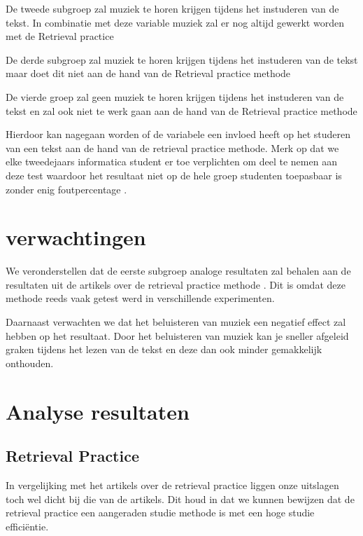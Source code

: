\documentclass{hogent-article}
\begin{document}
	De tweede subgroep zal muziek te horen krijgen tijdens het instuderen van de tekst. In combinatie met deze variable muziek zal er nog altijd gewerkt worden met de Retrieval practice
	
	De derde subgroep zal muziek te horen krijgen tijdens het instuderen van de tekst maar doet dit niet aan de hand van de Retrieval practice methode
	
	De vierde groep zal geen muziek te horen krijgen tijdens het instuderen van de tekst en zal ook niet te werk gaan aan de hand van de Retrieval practice methode
	
	Hierdoor kan nagegaan worden of de variabele een invloed heeft op het studeren van een tekst aan de hand van de retrieval practice methode. Merk op dat we elke tweedejaars informatica student er toe verplichten om deel te nemen aan deze test waardoor het resultaat niet op de hele groep studenten toepasbaar is zonder enig foutpercentage \autocite{karpicke2009metacognitive}.
	
	\section{verwachtingen}
	We veronderstellen dat de eerste subgroep analoge resultaten zal behalen aan de resultaten uit de artikels over de retrieval practice methode \autocite{butler2010repeated, pyc2012test, karpicke2007repeated, karpicke2008critical}. Dit is omdat deze methode reeds vaak getest werd in verschillende experimenten.
	
	Daarnaast verwachten we dat het beluisteren van muziek een negatief effect zal hebben op het resultaat. Door het beluisteren van muziek kan je sneller afgeleid graken tijdens het lezen van de tekst en deze dan ook minder gemakkelijk onthouden.
	
	\section{Analyse resultaten}
	\subsection{Retrieval Practice}
	In vergelijking met het artikels over de retrieval practice \autocite{butler2010repeated, pyc2012test, karpicke2007repeated, karpicke2008critical} liggen onze uitslagen toch wel dicht bij die van de artikels. Dit houd in dat we kunnen bewijzen dat de retrieval practice een aangeraden studie methode is met een hoge studie efficiëntie.
	
\end{document}
